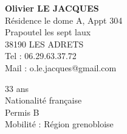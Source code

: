 \begin{chapeau}
	\begin{adresse}
		\textbf{Olivier LE JACQUES}\\
		Résidence le dome A, Appt 304\\
		Prapoutel les sept laux\\
		38190 LES ADRETS\\
		Tel : 06.29.63.37.72\\
		Mail : o.le.jacques@gmail.com\\
	\end{adresse}
	\begin{etatcivil}
		33 ans \\
        Nationalité française \\
		Permis B \\
        Mobilité : Région grenobloise \\
	\end{etatcivil}
\end{chapeau}